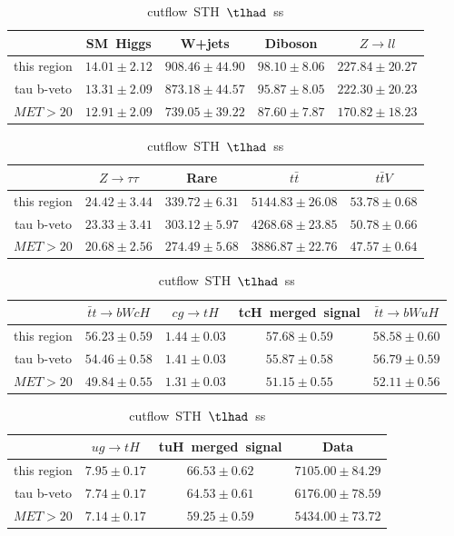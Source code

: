 \begin{table}
\caption{cutflow~STH~$\tlhad$~ss}
\centering
\begin{tabular}{|c|c|c|c|c|} \hline
 & SM~Higgs & W+jets & Diboson & $Z\to ll$\\\hline
this region & $14.01\pm2.12$ & $908.46\pm44.90$ & $98.10\pm8.06$ & $227.84\pm20.27$\\\hline
tau b-veto & $13.31\pm2.09$ & $873.18\pm44.57$ & $95.87\pm8.05$ & $222.30\pm20.23$\\\hline
$MET>20$ & $12.91\pm2.09$ & $739.05\pm39.22$ & $87.60\pm7.87$ & $170.82\pm18.23$\\\hline
\end{tabular}
\begin{tabular}{|c|c|c|c|c|} \hline
 & $Z\to \tau\tau$ & Rare & $t\bar{t}$ & $t\bar{t}V$\\\hline
this region & $24.42\pm3.44$ & $339.72\pm6.31$ & $5144.83\pm26.08$ & $53.78\pm0.68$\\\hline
tau b-veto & $23.33\pm3.41$ & $303.12\pm5.97$ & $4268.68\pm23.85$ & $50.78\pm0.66$\\\hline
$MET>20$ & $20.68\pm2.56$ & $274.49\pm5.68$ & $3886.87\pm22.76$ & $47.57\pm0.64$\\\hline
\end{tabular}
\begin{tabular}{|c|c|c|c|c|} \hline
 & $\bar{t}t\to bWcH$ & $cg\to tH$ & tcH~merged~signal & $\bar{t}t\to bWuH$\\\hline
this region & $56.23\pm0.59$ & $1.44\pm0.03$ & $57.68\pm0.59$ & $58.58\pm0.60$\\\hline
tau b-veto & $54.46\pm0.58$ & $1.41\pm0.03$ & $55.87\pm0.58$ & $56.79\pm0.59$\\\hline
$MET>20$ & $49.84\pm0.55$ & $1.31\pm0.03$ & $51.15\pm0.55$ & $52.11\pm0.56$\\\hline
\end{tabular}
\begin{tabular}{|c|c|c|c|} \hline
 & $ug\to tH$ & tuH~merged~signal & Data\\\hline
this region & $7.95\pm0.17$ & $66.53\pm0.62$ & $7105.00\pm84.29$\\\hline
tau b-veto & $7.74\pm0.17$ & $64.53\pm0.61$ & $6176.00\pm78.59$\\\hline
$MET>20$ & $7.14\pm0.17$ & $59.25\pm0.59$ & $5434.00\pm73.72$\\\hline
\end{tabular}
\label{tab:cutflow_reg1l1tau1b2j_ss}
\end{table}
